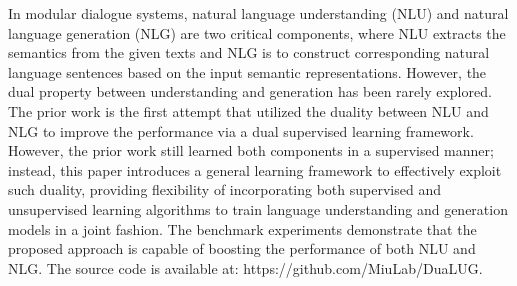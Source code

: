 In modular dialogue systems, natural language understanding (NLU) and natural language generation (NLG) are two critical components, where NLU extracts the semantics from the given texts and NLG is to construct corresponding natural language sentences based on the input semantic representations. However, the dual property between understanding and generation has been rarely explored. The prior work is the first attempt that utilized the duality between NLU and NLG to improve the performance via a dual supervised learning framework. However, the prior work still learned both components in a supervised manner; instead, this paper introduces a general learning framework to effectively exploit such duality, providing flexibility of incorporating both supervised and unsupervised learning algorithms to train language understanding and generation models in a joint fashion. The benchmark experiments demonstrate that the proposed approach is capable of boosting the performance of both NLU and NLG. The source code is available at: https://github.com/MiuLab/DuaLUG.
